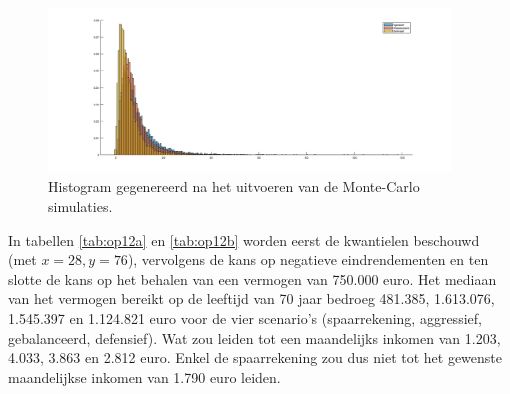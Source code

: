 \begin{figure}
\centering
\includegraphics[width=0.95\textwidth]{res/op11.png}
\caption{Histogram gegenereerd na het uitvoeren van de Monte-Carlo simulaties.}
\label{fig:op11}
\end{figure}
\thispagestyle{empty}
\restoregeometry



In tabellen \ref{tab:op12a} en \ref{tab:op12b} worden eerst de kwantielen beschouwd (met $x=28, y=76$), vervolgens de kans op negatieve eindrendementen en ten slotte de kans op het behalen van een vermogen van 750.000 euro. Het mediaan van het vermogen bereikt op de leeftijd van 70 jaar bedroeg 481.385, 1.613.076, 1.545.397 en 1.124.821 euro voor de vier scenario's (spaarrekening, aggressief, gebalanceerd, defensief). Wat zou leiden tot een maandelijks inkomen van 1.203, 4.033, 3.863 en 2.812 euro. Enkel de spaarrekening zou dus niet tot het gewenste maandelijkse inkomen van 1.790 euro leiden.

